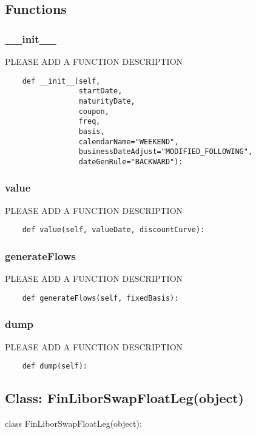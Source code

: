 \documentclass[twoside,11pt]{book}
\begin{document}
\subsection*{Functions}

\subsubsection*{{\bf \_\_init\_\_}}
PLEASE ADD A FUNCTION DESCRIPTION

\begin{lstlisting}
    def __init__(self,
                 startDate,
                 maturityDate,
                 coupon,
                 freq,
                 basis,
                 calendarName="WEEKEND",
                 businessDateAdjust="MODIFIED_FOLLOWING",
                 dateGenRule="BACKWARD"):
\end{lstlisting}

\subsubsection*{{\bf value}}
PLEASE ADD A FUNCTION DESCRIPTION

\begin{lstlisting}
    def value(self, valueDate, discountCurve):
\end{lstlisting}

\subsubsection*{{\bf generateFlows}}
PLEASE ADD A FUNCTION DESCRIPTION

\begin{lstlisting}
    def generateFlows(self, fixedBasis):
\end{lstlisting}

\subsubsection*{{\bf dump}}
PLEASE ADD A FUNCTION DESCRIPTION

\begin{lstlisting}
    def dump(self):
\end{lstlisting}

\subsection*{Class: FinLiborSwapFloatLeg(object)}
class FinLiborSwapFloatLeg(object): 
\end{document}

